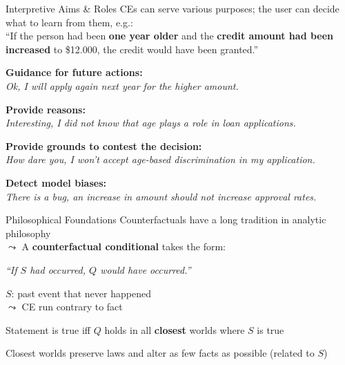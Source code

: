 \documentclass[10pt,compress,t,notes=noshow, xcolor=table]{beamer}
\begin{document}
\begin{framev}[align=top]{Interpretive Aims \& Roles}
CEs can serve various purposes; the user can decide what to learn from them, e.g.:\\
\spacer[0.25]
``If the person had been \textbf{one year older} and the \textbf{credit amount had been increased} to \$12.000, the credit would have been granted.''\\
\spacer[0.25]
\pause
\begin{itemizeM}
\item<+-> \textbf{Guidance for future actions:}\\
\textit{Ok, I will apply again next year for the higher amount.}
\item<+-> \textbf{Provide reasons:}\\
\textit{Interesting, I did not know that age plays a role in loan applications.}
\item<+-> \textbf{Provide grounds to contest the decision:}\\
\textit{How dare you, I won’t accept age-based discrimination in my application.}
\item<+-> \textbf{Detect model biases:}\\
\textit{There is a bug, an increase in amount should not increase approval rates.}
\end{itemizeM}
\end{framev}


\begin{framev}[align=top]{Philosophical Foundations }
Counterfactuals have a long tradition in analytic philosophy\\
$\leadsto$ A \textbf{counterfactual conditional} takes the form:
\begin{center}
\emph{``If $S$ had occurred, $Q$ would have occurred.''}
\end{center}
\begin{itemizeM}
\item $S$: past event that never happened\\
$\leadsto$ CE run contrary to fact
\item Statement is true iff $Q$ holds in all \textbf{closest} worlds where $S$ is true
\item Closest worlds preserve laws and alter as few facts as possible (related to $S$)
\end{itemizeM}
\end{framev}
\end{document}
